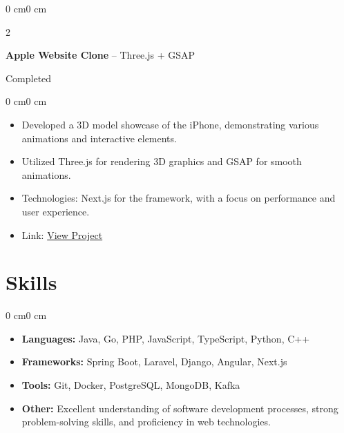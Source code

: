 \documentclass[10pt, letterpaper]{article}
\newenvironment{highlights}{
    \begin{itemize}[
        topsep=0.10 cm,
        parsep=0.10 cm,
        partopsep=0pt,
        itemsep=0pt,
        leftmargin=0 cm + 10pt
    ]
}{
    \end{itemize}
}
\newenvironment{onecolentry}{
    \begin{adjustwidth}{0 cm}{0 cm}
}{
    \end{adjustwidth}
}
\newenvironment{twocolentry}[2][]{
    \onecolentry
    \def\secondColumn{#2}
    \setcolumnwidth{\fill, 4.5 cm}
    \begin{paracol}{2}
}{
    \switchcolumn \raggedleft \secondColumn
    \end{paracol}
    \endonecolentry
}
\begin{document}
\begin{twocolentry}{Completed}
    \textbf{Apple Website Clone} -- Three.js + GSAP
\end{twocolentry}

\vspace{0.10 cm}
\begin{onecolentry}
    \begin{highlights}
        \item Developed a 3D model showcase of the iPhone, demonstrating various animations and interactive elements.
        \item Utilized Three.js for rendering 3D graphics and GSAP for smooth animations.
        \item Technologies: Next.js for the framework, with a focus on performance and user experience.
        \item Link: \href{https://apple-website-clone-3-d-animations.vercel.app/}{View Project}
    \end{highlights}
\end{onecolentry}

\vspace{0.5 cm}

\section{Skills}
\begin{onecolentry}
    \begin{highlights}
        \item \textbf{Languages:} Java, Go, PHP, JavaScript, TypeScript, Python, C++
        \item \textbf{Frameworks:} Spring Boot, Laravel, Django, Angular, Next.js
        \item \textbf{Tools:} Git, Docker, PostgreSQL, MongoDB, Kafka
        \item \textbf{Other:} Excellent understanding of software development processes, strong problem-solving skills, and proficiency in web technologies.
    \end{highlights}
\end{onecolentry}

\vspace{0.5 cm}
\end{document}
